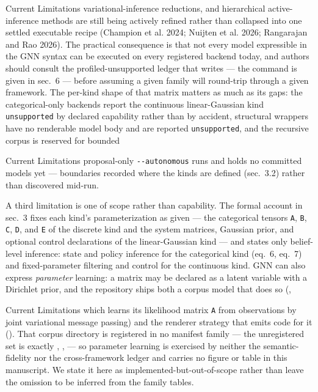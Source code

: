 \documentclass[
  ignorenonframetext,
]{beamer}
\begin{document}
\begin{frame}{Current Limitations}
variational-inference reductions, and hierarchical active-inference
methods are still being actively refined rather than collapsed into one
settled executable recipe (Champion et al. 2024; Nuijten et al. 2026;
Rangarajan and Rao 2026). The practical consequence is that not every
model expressible in the GNN syntax can be executed on every registered
backend today, and authors should consult the profiled-unsupported
ledger that  writes
--- the command is given in sec.~6 --- before
assuming a given family will round-trip through a given framework. The
per-kind shape of that matrix matters as much as its gaps: the
categorical-only backends report the continuous linear-Gaussian kind
\texttt{unsupported} by declared capability rather than by accident,
structural wrappers have no renderable model body and are reported
\texttt{unsupported}, and the recursive corpus is reserved for bounded
\end{frame}

\begin{frame}{Current Limitations}
proposal-only \texttt{-\/-autonomous} runs and holds no committed models
yet --- boundaries recorded where the kinds are defined
(sec.~3.2) rather than discovered mid-run.

A third limitation is one of scope rather than capability. The formal
account in sec.~3 fixes each kind's
parameterization as given --- the categorical tensors \texttt{A},
\texttt{B}, \texttt{C}, \texttt{D}, and \texttt{E} of the discrete kind
and the system matrices, Gaussian prior, and optional control
declarations of the linear-Gaussian kind --- and states only
belief-level inference: state and policy inference for the categorical
kind (eq.~6, eq.~7) and fixed-parameter filtering
and control for the continuous kind. GNN can also express
\emph{parameter} learning: a matrix may be declared as a latent variable
with a Dirichlet prior, and the repository ships both a corpus model
that does so
(,
\end{frame}

\begin{frame}{Current Limitations}
which learns its likelihood matrix \texttt{A} from observations by joint
variational message passing) and the renderer strategy that emits code
for it (). That
corpus directory is registered in no manifest family --- the
unregistered set is exactly ,
,  ---
so parameter learning is exercised by neither the semantic-fidelity nor
the cross-framework ledger and carries no figure or table in this
manuscript. We state it here as implemented-but-out-of-scope rather than
leave the omission to be inferred from the family tables.

\end{frame}
\end{document}
